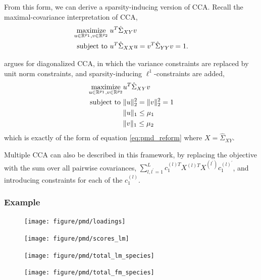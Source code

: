 \documentclass[14pt]{extarticle}
\begin{document}
From this form, we can derive a sparsity-inducing version of
CCA. Recall the maximal-covariance interpretation of CCA,
\begin{align*}
  \mathop\mathrm{maximize}_{u \in \mathbb{R}^{p_{1}}, v \in \mathbb{R}^{p_{2}}} \medspace &u^{T}\hat{\Sigma}_{XY}v \\
  \text{subject to } &u^{T}\hat{\Sigma}_{XX} u = v^{ T}\hat{\Sigma}_{YY}v = 1.
\end{align*}

\citep{witten2009penalized} argues for diagonalized CCA, in which the variance
constraints are replaced by unit norm constraints, and sparsity-inducing
$\ell^{1}$-constraints are added,
\begin{align*}
  \mathop\mathrm{maximize}_{u \in \mathbb{R}^{p_{1}}, v \in
    \mathbb{R}^{p_{2}}} & u^T\hat{\Sigma}_{XY}v  \\
  \text{subject to } &\|u\|_{2}^{2} = \|v\|_{2}^{2} = 1 \\
  &\|u\|_{1} \leq \mu_{1} \\
  &\|v\|_{1} \leq \mu_{2}
\end{align*}
which is exactly of the form of equation \ref{eq:pmd_reform} where $X =
\hat{\Sigma}_{XY}$.

Multiple CCA can also be described in this framework, by replacing the objective
with the sum over all pairwise covariances, $\sum_{l, l^{\prime} = 1}^{L}
c_{1}^{(l) T}X^{(l) T}X^{(l^{\prime})}c_{1}^{(l)^{\prime}}$, and introducing
constraints for each of the $c_{1}^{(l)}$.

\subsubsection{Example}
\label{subsec:sparse_cca_example}

\begin{figure}
  \centering
  \texttt{[image: figure/pmd/loadings]}
  \caption{\label{fig:pmd_loadings} }
\end{figure}

\begin{figure}
  \centering
  \texttt{[image: figure/pmd/scores\_lm]}
  \caption{\label{fig:pmd_scores_lm} }
\end{figure}

\begin{figure}
  \centering
  \texttt{[image: figure/pmd/total\_lm\_species]}
  \caption{\label{fig:pmd_total_lm_species}}
\end{figure}

\begin{figure}
  \centering
  \texttt{[image: figure/pmd/total\_fm\_species]}
  \caption{\label{fig:pmd_total_fm_species}}
\end{figure}
\end{document}
